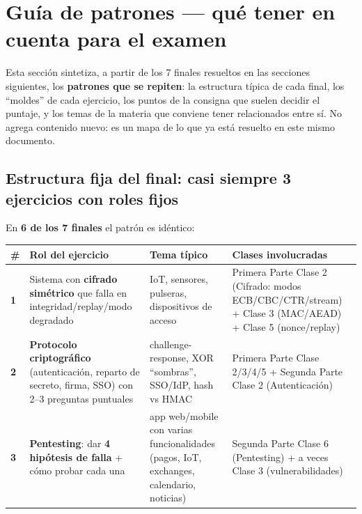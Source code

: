 \section{Guía de patrones --- qué tener en cuenta para el examen}
Esta sección sintetiza, a partir de los 7 finales resueltos en las secciones siguientes,
los \textbf{patrones que se repiten}: la estructura típica de cada final, los ``moldes'' de
cada ejercicio, los puntos de la consigna que suelen decidir el puntaje, y los temas de la
materia que conviene tener relacionados entre sí. No agrega contenido nuevo: es un mapa de
lo que ya está resuelto en este mismo documento.

\subsection{Estructura fija del final: casi siempre 3 ejercicios con roles fijos}
En \textbf{6 de los 7 finales} el patrón es idéntico:

\begin{center}
\small
\begin{tabular}{@{}p{}p{}p{}p{}@{}}
\toprule
\textbf{\#} & \textbf{Rol del ejercicio} & \textbf{Tema típico} & \textbf{Clases involucradas} \\
\midrule
\textbf{1} & Sistema con \textbf{cifrado simétrico} que falla en integridad/replay/modo
degradado & IoT, sensores, pulseras, dispositivos de acceso &
Primera Parte Clase 2 (Cifrado: modos ECB/CBC/CTR/stream) + Clase 3 (MAC/AEAD) + Clase 5
(nonce/replay) \\
\textbf{2} & \textbf{Protocolo criptográfico} (autenticación, reparto de secreto, firma,
SSO) con 2--3 preguntas puntuales & challenge-response, XOR ``sombras'', SSO/IdP, hash vs
HMAC & Primera Parte Clase 2/3/4/5 + Segunda Parte Clase 2 (Autenticación) \\
\textbf{3} & \textbf{Pentesting}: dar \textbf{4 hipótesis de falla} + cómo probar cada una
& app web/mobile con varias funcionalidades (pagos, IoT, exchanges, calendario, noticias) &
Segunda Parte Clase 6 (Pentesting) + a veces Clase 3 (vulnerabilidades) \\
\bottomrule
\end{tabular}
\end{center}

